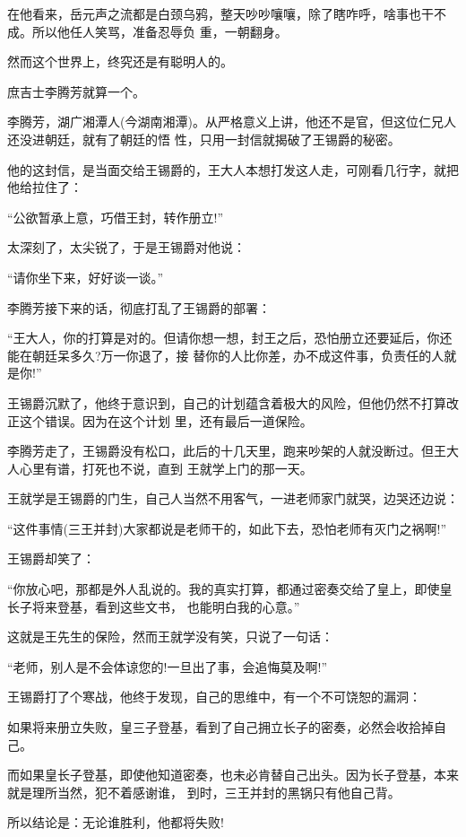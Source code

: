 \documentclass[11pt,a4paper,onecolumn]{article}
\begin{document}
在他看来，岳元声之流都是白颈乌鸦，整天吵吵嚷嚷，除了瞎咋呼，啥事也干不成。所以他任人笑骂，准备忍辱负
重，一朝翻身。

然而这个世界上，终究还是有聪明人的。

庶吉士李腾芳就算一个。

李腾芳，湖广湘潭人(今湖南湘潭)。从严格意义上讲，他还不是官，但这位仁兄人还没进朝廷，就有了朝廷的悟
性，只用一封信就揭破了王锡爵的秘密。

他的这封信，是当面交给王锡爵的，王大人本想打发这人走，可刚看几行字，就把他给拉住了：

``公欲暂承上意，巧借王封，转作册立!''

太深刻了，太尖锐了，于是王锡爵对他说：

``请你坐下来，好好谈一谈。''

李腾芳接下来的话，彻底打乱了王锡爵的部署：

``王大人，你的打算是对的。但请你想一想，封王之后，恐怕册立还要延后，你还能在朝廷呆多久?万一你退了，接
替你的人比你差，办不成这件事，负责任的人就是你!''

王锡爵沉默了，他终于意识到，自己的计划蕴含着极大的风险，但他仍然不打算改正这个错误。因为在这个计划
里，还有最后一道保险。

李腾芳走了，王锡爵没有松口，此后的十几天里，跑来吵架的人就没断过。但王大人心里有谱，打死也不说，直到
王就学上门的那一天。

王就学是王锡爵的门生，自己人当然不用客气，一进老师家门就哭，边哭还边说：

``这件事情(三王并封)大家都说是老师干的，如此下去，恐怕老师有灭门之祸啊!''

王锡爵却笑了：

``你放心吧，那都是外人乱说的。我的真实打算，都通过密奏交给了皇上，即使皇长子将来登基，看到这些文书，
也能明白我的心意。''

这就是王先生的保险，然而王就学没有笑，只说了一句话：

``老师，别人是不会体谅您的!一旦出了事，会追悔莫及啊!''

王锡爵打了个寒战，他终于发现，自己的思维中，有一个不可饶恕的漏洞：

如果将来册立失败，皇三子登基，看到了自己拥立长子的密奏，必然会收拾掉自己。

而如果皇长子登基，即使他知道密奏，也未必肯替自己出头。因为长子登基，本来就是理所当然，犯不着感谢谁，
到时，三王并封的黑锅只有他自己背。

所以结论是：无论谁胜利，他都将失败!

\section[\thesection]{}
\end{document}

